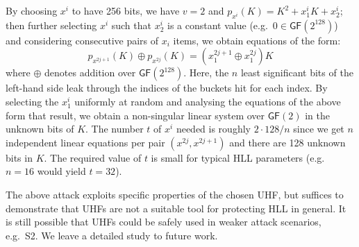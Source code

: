 \documentclass[sigconf, anonymous, dvipsnames]{acmart} %
\begin{document}

By choosing $x^i$ to have 256 bits, we have $v=2$ and $p_{x^i}(K) = K^2 + x^i_1K+x^i_2$; then further selecting $x^i$ such that  $x^i_2$ is a constant value (e.g.\ $0 \in \textsf{GF}(2^{128})$) and considering consecutive pairs of $x_i$ items, we obtain equations of the form:
\[
p_{x^{2j+1}}(K) \oplus p_{x^{2j}}(K) = (x^{2j+1}_1 \oplus x^{2j}_1)K
\]
where $\oplus$ denotes addition over $\textsf{GF}(2^{128})$. Here, the $n$ least significant bits of the left-hand side leak through the indices of the buckets hit for each index. By selecting the $x^i_1$ uniformly at random and analysing the equations of the above form that result, we obtain a non-singular linear system over $\textsf{GF}(2)$ in the unknown bits of $K$. The number $t$ of $x^i$ needed is roughly $2\cdot128/n$ since we get $n$ independent linear equations per pair $(x^{2j},x^{2j+1})$ and there are 128 unknown bits in $K$. The required value of $t$ is small for typical HLL parameters (e.g. $n=16$ would yield $t=32$).

 
The above attack exploits specific properties of the chosen UHF, but suffices to demonstrate that UHFs are not a suitable tool for protecting HLL in general. It is still possible that UHFs could be safely used in weaker attack scenarios, e.g.\ S2. We leave a detailed study to future work. 
\end{document}
